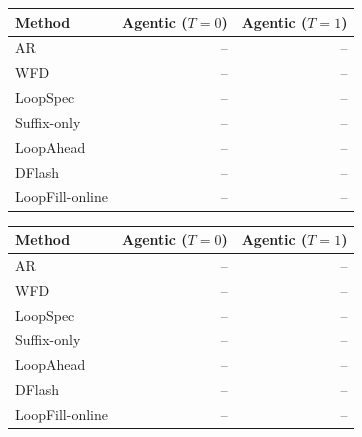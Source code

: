 \begin{tabular}{lrr}
\hline
Method & Agentic ($T=0$) & Agentic ($T=1$) \\
\hline
AR & -- & -- \\
WFD & -- & -- \\
LoopSpec & -- & -- \\
Suffix-only & -- & -- \\
LoopAhead & -- & -- \\
DFlash & -- & -- \\
LoopFill-online & -- & -- \\
\hline
\end{tabular}

\begin{tabular}{lrr}
\hline
Method & Agentic ($T=0$) & Agentic ($T=1$) \\
\hline
AR & -- & -- \\
WFD & -- & -- \\
LoopSpec & -- & -- \\
Suffix-only & -- & -- \\
LoopAhead & -- & -- \\
DFlash & -- & -- \\
LoopFill-online & -- & -- \\
\hline
\end{tabular}

